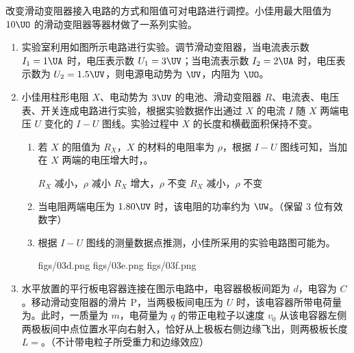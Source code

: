 \documentclass[\gkver]{gaokaozhenti}
\begin{document}
\begin{enumerate}
改变滑动变阻器接入电路的方式和阻值可对电路进行调控。小佳用最大阻值为 $10 \UO$ 的滑动变阻器等器材做了一系列实验。
\begin{enumerate}
	\item
	实验室利用如图所示电路进行实验。调节滑动变阻器，当电流表示数 $I_{1}=1 \UA$ 时，电压表示数 $U_{1}=3 \UV$；当电流表示数 $I_{2}=2 \UA$ 时，电压表示数为 $U_{2}=1.5 \UV$，则电源电动势为 $\UV$，内阻为 $\UO$。

	\onepicture[h=2.6cm, align=right]{}

	\item
	小佳用柱形电阻 $X$、电动势为 $3 \UV$ 的电池、滑动变阻器 $R$、电流表、电压表、开关连成电路进行实验，根据实验数据作出通过 $X$ 的电流 $I$ 随 $X$ 两端电压 $U$ 变化的 $I-U$ 图线。实验过程中 $X$ 的长度和横截面积保持不变。

	\onepicture[h=3.5cm, align=right]{}

	\begin{enumerate}
		\item
		若 $X$ 的阻值为 $R_{X}$，$X$ 的材料的电阻率为 $\rho$，根据 $I-U$ 图线可知，当加在 $X$ 两端的电压增大时，。

		{$R_{X}$ 减小，$\rho$ 减小}
		{$R_{X}$ 增大，$\rho$ 不变}
		{$R_{X}$ 减小，$\rho$ 不变}

		\item
		当电阻两端电压为 $1.80 \UV$ 时，该电阻的功率约为 $\UW$。（保留 3 位有效数字）

		\item
		根据 $I-U$ 图线的测量数据点推测，小佳所采用的实验电路图可能为。

		{figs/03d.png}
		{figs/03e.png}
		{figs/03f.png}
	\end{enumerate}

	\item
	水平放置的平行板电容器连接在图示电路中，电容器极板间距为 $d$，电容为 $C$。移动滑动变阻器的滑片 P，当两极板间电压为 $U$ 时，该电容器所带电荷量为。此时，一质量为 $m$，电荷量为 $q$ 的带正电粒子以速度 $v_{0}$ 从该电容器左侧两极板间中点位置水平向右射入，恰好从上极板右侧边缘飞出，则两极板长度 $L=$。（不计带电粒子所受重力和边缘效应）

	\onepicture[h=2.8cm, align=right]{}
\end{enumerate}
\end{enumerate}
\end{document}
